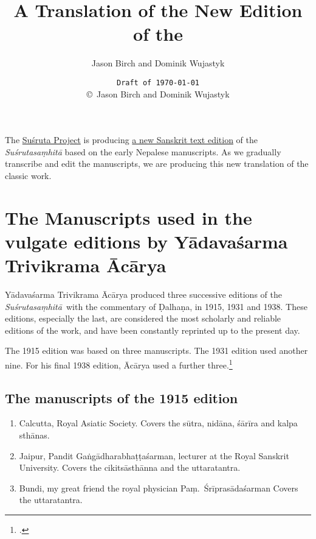 \documentclass[12pt]{article}
\title{A Translation of the New Edition of the \SS}
\author{Jason Birch and Dominik Wujastyk}
\date{\texttt{Draft of \today}\\ \copyright\ Jason Birch and Dominik Wujastyk}
\renewcommand{\SS}{\emph{Suśrutasaṃhitā}}
\begin{document}
       
    
    \maketitle
    
    
        \noindent The \href{http://sushrutaproject.org}{Suśruta Project} is
producing
\href{https://saktumiva.org/wiki/wujastyk/susrutasamhita/01-su.su/provisional-edition_sutrasthana}{a
 new Sanskrit text edition} of the \emph{Suśrutasaṃhitā} based on the early 
Nepalese manuscripts.  As we gradually transcribe and edit the manuscripts, we are 
producing this new translation of the classic work.
        
        \tableofcontents
        
        \newpage
        \section{The Manuscripts used in the vulgate editions by 
        Yādavaśarma Trivikrama Ācārya}
    
        Yādavaśarma Trivikrama Ācārya produced three successive editions of the \SS\ 
        with the commentary of Ḍalhaṇa, in 1915, 1931 and 1938.  These editions, 
        especially the last, are considered the most scholarly and reliable editions of the 
        work, and have been constantly reprinted up to the present day.
        
        The 1915 edition was based on three manuscripts.  The 1931 edition used 
        another nine.  For his final 1938 edition, Ācārya used a further 
        three.\footnote{\cite[22]{susr-trikamji3}.}
        
        \subsection{The manuscripts of the 1915 edition}
        
        \begin{enumerate}
            \item[1] Calcutta, Royal Asiatic Society.  Covers the sūtra, nidāna, śārīra and 
            kalpa sthānas.  
            
            \item [2] Jaipur, Pandit Gaṅgādharabhaṭṭaśarman, lecturer at the Royal 
            Sanskrit University.  Covers the cikitsāsthānna and the uttaratantra.
            
            \item [3]  Bundi, my great friend the royal physician Paṃ.\ Śrīprasādaśarman  
            Covers the uttaratantra.
        \end{enumerate}
        
\end{document}
